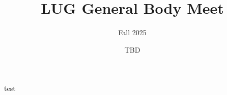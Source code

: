 \documentclass{beamer}
\title{LUG General Body Meet}
\subtitle{Fall 2025}
\date{TBD}
\institute{Linux Users Group @ UIC}
\begin{document}
  \begin{frame}
    \maketitle
  \end{frame}

  \begin{frame}
    test
  \end{frame}
\end{document}
